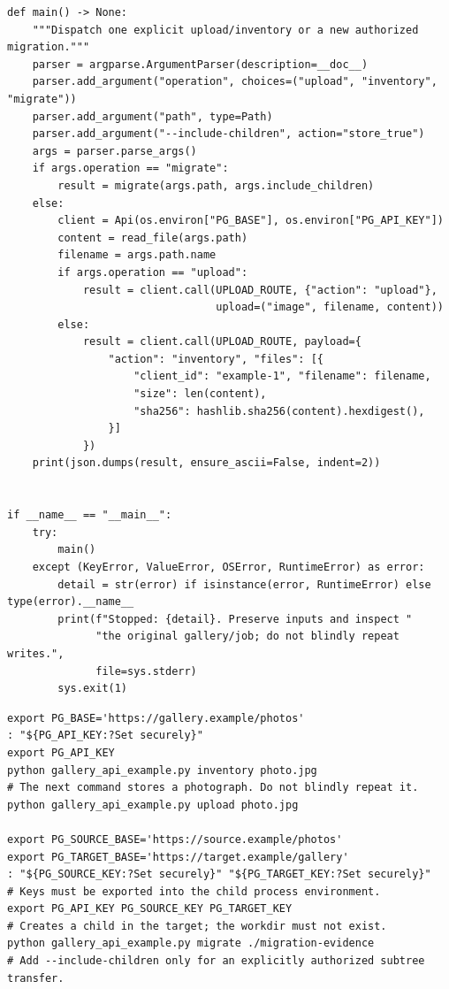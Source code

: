 \documentclass[11pt,a4paper]{article}
\begin{document}
\begin{lstlisting}[language={}]
def main() -> None:
    """Dispatch one explicit upload/inventory or a new authorized migration."""
    parser = argparse.ArgumentParser(description=__doc__)
    parser.add_argument("operation", choices=("upload", "inventory", "migrate"))
    parser.add_argument("path", type=Path)
    parser.add_argument("--include-children", action="store_true")
    args = parser.parse_args()
    if args.operation == "migrate":
        result = migrate(args.path, args.include_children)
    else:
        client = Api(os.environ["PG_BASE"], os.environ["PG_API_KEY"])
        content = read_file(args.path)
        filename = args.path.name
        if args.operation == "upload":
            result = client.call(UPLOAD_ROUTE, {"action": "upload"},
                                 upload=("image", filename, content))
        else:
            result = client.call(UPLOAD_ROUTE, payload={
                "action": "inventory", "files": [{
                    "client_id": "example-1", "filename": filename,
                    "size": len(content),
                    "sha256": hashlib.sha256(content).hexdigest(),
                }]
            })
    print(json.dumps(result, ensure_ascii=False, indent=2))


if __name__ == "__main__":
    try:
        main()
    except (KeyError, ValueError, OSError, RuntimeError) as error:
        detail = str(error) if isinstance(error, RuntimeError) else type(error).__name__
        print(f"Stopped: {detail}. Preserve inputs and inspect "
              "the original gallery/job; do not blindly repeat writes.",
              file=sys.stderr)
        sys.exit(1)
\end{lstlisting}

\begin{lstlisting}[language={}]
export PG_BASE='https://gallery.example/photos'
: "${PG_API_KEY:?Set securely}"
export PG_API_KEY
python gallery_api_example.py inventory photo.jpg
# The next command stores a photograph. Do not blindly repeat it.
python gallery_api_example.py upload photo.jpg

export PG_SOURCE_BASE='https://source.example/photos'
export PG_TARGET_BASE='https://target.example/gallery'
: "${PG_SOURCE_KEY:?Set securely}" "${PG_TARGET_KEY:?Set securely}"
# Keys must be exported into the child process environment.
export PG_API_KEY PG_SOURCE_KEY PG_TARGET_KEY
# Creates a child in the target; the workdir must not exist.
python gallery_api_example.py migrate ./migration-evidence
# Add --include-children only for an explicitly authorized subtree transfer.
\end{lstlisting}
\end{document}
